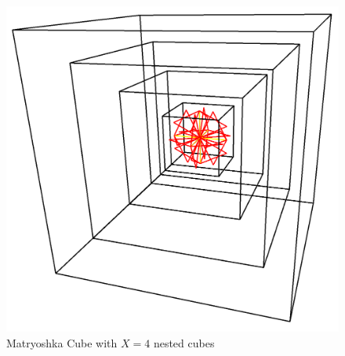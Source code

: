 \begin{figure}[H]
    \begin{center}
    \includegraphics[width=\textwidth]{figures/experiments/matryoshka_4.png}
    \end{center}
    \caption[Matryoshka Cube with $X=4$ nested cubes]{Matryoshka Cube with $X=4$ nested cubes}
    \label{fig:matryoshka4}
\end{figure}
